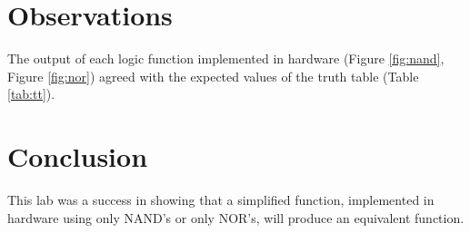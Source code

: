 \documentclass[12pt]{article}
\begin{document}
\section{Observations}

The output of each logic function implemented in hardware
(Figure \ref{fig:nand}, Figure \ref{fig:nor}) agreed with the expected values
of the truth table (Table \ref{tab:tt}).

\section{Conclusion}

This lab was a success in showing that a simplified function,
implemented in hardware using only NAND's or only NOR's,
will produce an equivalent function.


%
%

\end{document}
